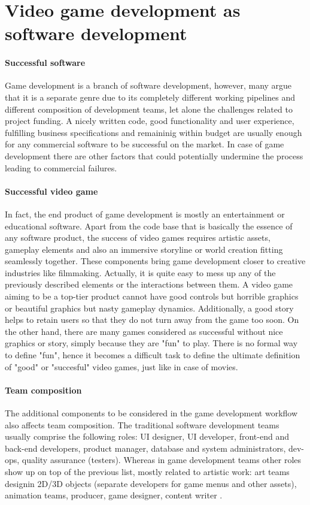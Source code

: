 \section{Video game development as software development} \label{game-development-sw}
\paragraph{Successful software}
Game development is a branch of software development, however, many argue that it is a separate genre
due to its completely different working pipelines and different composition of development teams, let alone the challenges 
related to project funding. A nicely written code, good functionality and user experience, fulfilling business specifications 
and remaininig within budget are usually enough for any commercial software to be successful on the market. In case of game 
development there are other factors that could potentially undermine the process leading to commercial failures.
\paragraph{Successful video game}
In fact, the end product of game development is mostly an entertainment or educational software. Apart from the code 
base that is basically the essence of any software product, the success of video games requires artistic assets, 
gameplay elements and also an immersive storyline or world creation fitting seamlessly together.
These components bring game development closer to creative industries like filmmaking. Actually, it is quite easy to mess
up any of the previously described elements or the interactions between them. 
A video game aiming to be a top-tier product cannot have good controls but horrible graphics
or beautiful graphics but nasty gameplay dynamics. Additionally, a good story helps to retain users so that
they do not turn away from the game too soon. On the other hand, there are many games considered as successful without
nice graphics or story, simply because they are "fun" to play. There is no formal way to define "fun", hence it becomes
a difficult task to define the ultimate definition of "good" or "succesful" video games, just like in case of movies.

\paragraph{Team composition}
The additional components to be considered in the game development workflow also affects team composition. The traditional
software development teams usually comprise the following roles: UI designer, UI developer, front-end and back-end developers,
product manager, database and system administrators, dev-ops, quality assurance (testers). Whereas in game development teams
other roles show up on top of the previous list, mostly related to artistic work: art teams designin 2D/3D objects 
(separate developers for game menus and other assets), animation teams, producer, game designer, content writer 
\cite{team-composition}.

